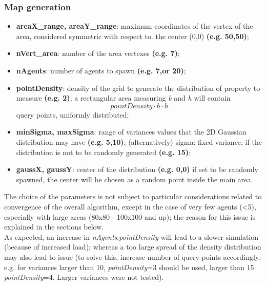 \documentclass[a4paper,11pt,oneside]{book}
\begin{document}
	\subsubsection{Map generation}
	\begin{itemize}
		\item \textbf{areaX\_range, areaY\_range}: maximum coordinates of the vertex of the area, considered symmetric with respect to. the center (0,0) \textbf{(e.g. 50,50)};
		
		\item \textbf{nVert\_area}: number of the area vertexes \textbf{(e.g. 7)};
		
		\item \textbf{nAgents}: number of agents to spawn \textbf{(e.g. 7,or 20)};
		\\
		
		\item \textbf{pointDensity}: density of the grid to generate the distribution of property to measure \textbf{(e.g. 2)}; a rectangular area measuring \textit{b} and \textit{h} will contain $$\mathit{pointDensity}\cdot b\cdot h$$ query points, uniformly distributed;
		
		\item \textbf{minSigma, maxSigma}: range of variances values that the 2D Gaussian distribution may have \textbf{(e.g. 5,10)};
		\subitem (alternatively) sigma: fixed variance, if the distribution is not to be randomly generated \textbf{(e.g. 15)};
		
		\item \textbf{gaussX, gaussY}: center of the distribution \textbf{(e.g. 0,0)}
		\subitem if set to be randomly spawned, the center will be chosen as a random point inside the main area.
		
	\end{itemize}
	The choice of the parameters is not subject to particular considerations related to convergence of the overall algorithm, except in the case of very few agents (\textless5), especially with large areas (80x80 - 100x100 and up); the reason for this issue is explained in the sections below.\\
	
	As expected, an increase in \emph{nAgents},\emph{pointDensity} will lead to a slower simulation (because of increased load); whereas a too large spread of the density distribution may also lead to issue (to solve this, increase number of query points accordingly; e.g. for variances larger than 10, \emph{pointDensity}=3 should be used, larger than 15 \emph{pointDensity}=4. Larger variances were not tested).\\
	
\end{document}
